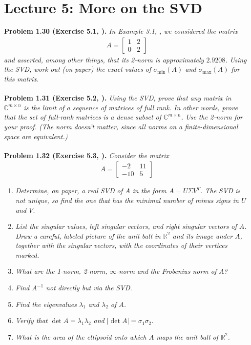\documentclass[a4paper,oneside]{book}
\numberwithin{equation}{chapter}
\begin{document}
\section{Lecture 5: More on the SVD}
\textbf{Problem 1.30 (Exercise 5.1, \cite{1}).} \textit{In Example 3.1, \cite{1}, we considered the matrix}
\begin{align}
A = \left[ {\begin{array}{*{20}{c}}
1&2\\
0&2
\end{array}} \right]
\end{align}
\textit{and asserted, among other things, that its 2-norm is approximately $2.9208$. Using the SVD, work out (on paper) the exact values of ${\sigma _{\min }}\left( A \right)$ and ${\sigma _{\max }}\left( A \right)$ for this matrix.}\\
\\
\textbf{Problem 1.31 (Exercise 5.2, \cite{1}).} \textit{Using the SVD, prove that any matrix in $\mathbb{C}^{m\times n}$ is the limit of a sequence of matrices of full rank. In other words, prove that the set of full-rank matrices is a dense subset of $\mathbb{C}^{m\times n}$. Use the 2-norm for your proof. (The norm doesn't matter, since all norms on a finite-dimensional space are equivalent.)}\\
\\
\textbf{Problem 1.32 (Exercise 5.3, \cite{1}).} \textit{Consider the matrix}
\begin{align}
A = \left[ {\begin{array}{*{20}{c}}
{ - 2}&{11}\\
{ - 10}&5
\end{array}} \right]
\end{align}
\begin{enumerate}
\item \textit{Determine, on paper, a real SVD of $A$ in the form $A =U\Sigma V^T$. The SVD is not unique, so find the one that has the minimal number of minus signs in $U$ and $V$.}
\item \textit{List the singular values, left singular vectors, and right singular vectors of $A$. Draw a careful, labeled  picture of the unit ball in $\mathbb{R}^2$ and its image under $A$, together with the singular vectors, with the coordinates of their vertices marked.}
\item \textit{What are the 1-norm, 2-norm, $\infty$-norm and the Frobenius norm of $A$?}
\item \textit{Find $A^{-1}$ not directly but via the SVD.}
\item \textit{Find the eigenvalues $\lambda _1$ and $\lambda _2$ of $A$.}
\item \textit{Verify that $\det A=\lambda _1 \lambda _2$ and $\left| {\det A} \right| = {\sigma _1}{\sigma _2}$.}
\item \textit{What is the area of the ellipsoid onto which $A$ maps the unit ball of $\mathbb{R}^2$.}
\end{enumerate}
\end{document}
